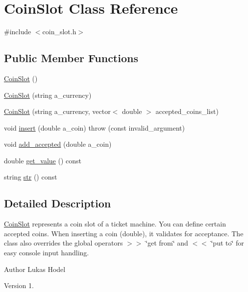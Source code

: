 \hypertarget{classCoinSlot}{\section{Coin\-Slot Class Reference}
\label{classCoinSlot}
}


{\ttfamily \#include $<$coin\-\_\-slot.\-h$>$}

\subsection*{Public Member Functions}
\begin{DoxyCompactItemize}
\item 
\hyperlink{classCoinSlot_a7ee2abc60da5a7af641eff10c5c4c2bf}{Coin\-Slot} ()
\item 
\hyperlink{classCoinSlot_a6f28eee0c3720fd4a6b25ca07dbdf4e2}{Coin\-Slot} (string a\-\_\-currency)
\item 
\hyperlink{classCoinSlot_a593bd91f1ec58c7d0de0502af3ff2331}{Coin\-Slot} (string a\-\_\-currency, vector$<$ double $>$ accepted\-\_\-coins\-\_\-list)
\item 
void \hyperlink{classCoinSlot_aeb67f3b2b68ed5c22c1d6f192f315104}{insert} (double a\-\_\-coin)  throw (const invalid\-\_\-argument)
\item 
void \hyperlink{classCoinSlot_a8ed8cda62086c21f647d215f47d31b3b}{add\-\_\-accepted} (double a\-\_\-coin)
\item 
double \hyperlink{classCoinSlot_aa349eea94746d3438335c7ef5337bf7c}{get\-\_\-value} () const 
\item 
string \hyperlink{classCoinSlot_af37381120a0315178139de6ce447741d}{str} () const 
\end{DoxyCompactItemize}


\subsection{Detailed Description}
\hyperlink{classCoinSlot}{Coin\-Slot} represents a coin slot of a ticket machine. You can define certain accepted coins. When inserting a coin (double), it validates for acceptance. The class also overrides the global operators $>$$>$ \char`\"{}get from\char`\"{} and $<$$<$ \char`\"{}put to\char`\"{} for easy console input handling.

\begin{DoxyAuthor}{Author}
Lukas Hodel 
\end{DoxyAuthor}
\begin{DoxyVersion}{Version}
1. 
\end{DoxyVersion}


